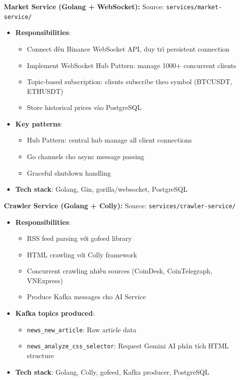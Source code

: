 \noindent\textbf{Market Service (Golang + WebSocket):}
Source: \texttt{services/market-service/}

\begin{itemize}
    \item \textbf{Responsibilities}:
    \begin{itemize}
        \item Connect đến Binance WebSocket API, duy trì persistent connection
        \item Implement WebSocket Hub Pattern: manage 1000+ concurrent clients
        \item Topic-based subscription: clients subscribe theo symbol (BTCUSDT, ETHUSDT)
        \item Store historical prices vào PostgreSQL
    \end{itemize}
    
    \item \textbf{Key patterns}:
    \begin{itemize}
        \item Hub Pattern: central hub manage all client connections
        \item Go channels cho async message passing
        \item Graceful shutdown handling
    \end{itemize}
    
    \item \textbf{Tech stack}: Golang, Gin, gorilla/websocket, PostgreSQL
\end{itemize}

\noindent\textbf{Crawler Service (Golang + Colly):}
Source: \texttt{services/crawler-service/}

\begin{itemize}
    \item \textbf{Responsibilities}:
    \begin{itemize}
        \item RSS feed parsing với gofeed library
        \item HTML crawling với Colly framework
        \item Concurrent crawling nhiều sources (CoinDesk, CoinTelegraph, VNExpress)
        \item Produce Kafka messages cho AI Service
    \end{itemize}
    
    \item \textbf{Kafka topics produced}:
    \begin{itemize}
        \item \texttt{news\_new\_article}: Raw article data
        \item \texttt{news\_analyze\_css\_selector}: Request Gemini AI phân tích HTML structure
    \end{itemize}
    
    \item \textbf{Tech stack}: Golang, Colly, gofeed, Kafka producer, PostgreSQL
\end{itemize}

